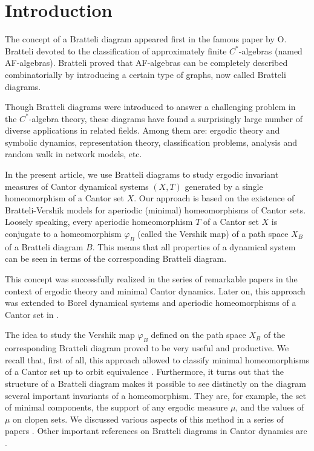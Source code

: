 \documentclass[11pt, english, reqno]{amsart}
\theoremstyle{definition}
\theoremstyle{remark}
\theoremstyle{plain}
\numberwithin{equation}{section}
\begin{document}
\section{Introduction}
The concept of a Bratteli diagram appeared first in the famous paper by
O. Bratteli  \cite{Bratteli1972} devoted to the classification of approximately 
finite $C^*$-algebras (named AF-algebras).
Bratteli proved that AF-algebras can be completely described
combinatorially by introducing a certain type of graphs, now called
Bratteli diagrams.

Though Bratteli diagrams were introduced to answer a challenging problem
in  the  $C^*$-algebra theory, these diagrams have  found a surprisingly
 large number of diverse applications in related fields.  Among them are:
 ergodic  theory and symbolic dynamics, representation theory, classification
problems,  analysis and random walk in network models, etc.

In the present article, we use Bratteli diagrams to study ergodic invariant
measures of Cantor dynamical systems $(X, T)$ generated by a single
homeomorphism of a Cantor set $X$. Our approach  is based on the
existence of Bratteli-Vershik models  for aperiodic
(minimal) homeomorphisms of Cantor sets.
Loosely speaking, every aperiodic homeomorphism $T$ of a Cantor set $X$
is conjugate to a homeomorphism $\varphi_B$ (called the Vershik map)
of a path space $X_B$ of a Bratteli diagram $B$. This means that 
 all properties of a dynamical system can be seen in terms of the corresponding  Bratteli diagram.

This concept was successfully realized in the series of remarkable  papers
\cite{Vershik1981, Vershik1982, HermanPutnamSkau1992,
 GiordanoPutnamSkau1995} in the context of  ergodic theory and minimal
 Cantor dynamics.  Later on,
this approach was extended to Borel dynamical systems and aperiodic
homeomorphisms of a Cantor set in
\cite{BezuglyiDooleyKwiatkowski2006, Medynets2007}.

The idea to study  the Vershik map $\varphi_B$ defined on the path
space $X_B$ of the corresponding Bratteli diagram  proved to be very useful
and productive. We recall that, first of all, this approach allowed to classify
 minimal  homeomorphisms of a Cantor set up to orbit equivalence
  \cite{GiordanoPutnamSkau1995, GiordanoMatuiPutnamSkau2010}.
 Furthermore, it turns out that the structure  of a Bratteli diagram makes it
 possible to see  distinctly on the diagram several important invariants of
 a homeomorphism. They are,  for example, the set of minimal components,
  the support of any ergodic measure
 $\mu$,  and the values of  $\mu$  on clopen sets. We discussed various
 aspects of this  method in a series of papers
 \cite{BezuglyiKwiatkowskiMedynetsSolomyak2010, BezuglyiKarpel2011,
 BezuglyiKwiatkowskiMedynetsSolomyak2013, BezuglyiHandelman2014,
 BezuglyiKwiatkowskiYassawi2014, BezuglyiJorgensen2015,
   BezuglyiKarpel2016}. Other important references on Bratteli diagrams in
   Cantor   dynamics are \cite{DurandHostSkau1999, Durand2010,
   GjerdeJohansen2000, Cortez2006, HamachiKeaneYuasa2011,
   KwiatkowskiWata2004,  Putnam2010, Skau2000}.
\end{document}
